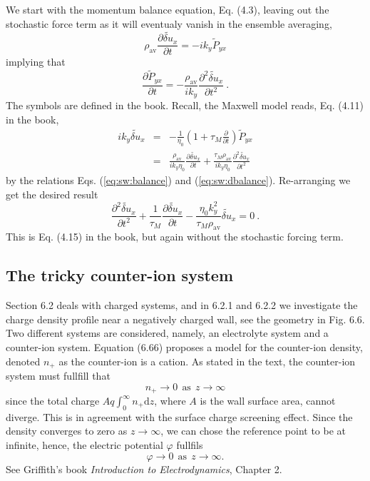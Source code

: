 \documentclass[11pt]{article}
\renewcommand{\d}{\mathrm{d}}
\begin{document}
We start with the momentum balance equation, Eq. (4.3), leaving out the stochastic force term as it will eventualy vanish in the ensemble 
averaging, 
\begin{equation}
	\label{eq:sw:balance}
	\rho_\text{av} \frac{\partial \widetilde{\delta u}_x}{\partial t} = -ik_y \widetilde{P}_{yx}
\end{equation}
implying that
\begin{equation}
	\label{eq:sw:dbalance}
	\frac{\partial \widetilde{P}_{yx}}{\partial t} = - \frac{\rho_\text{av}}{i k_y}\frac{\partial^2 \widetilde{\delta u}_x}{\partial t^2} \ .
\end{equation}
The symbols are defined in the book. Recall, the Maxwell model reads, Eq. (4.11) in the book,
\begin{eqnarray}
	ik_y \widetilde{\delta u}_x &=& - \frac{1}{\eta_0} \left(1 + \tau_M \frac{\partial}{\partial t}\right) \widetilde{P}_{yx} \\
	&=& \frac{\rho_\text{av}}{i k_y\eta_0} \frac{\partial \widetilde{\delta u}_x}{\partial t} 
	+ \frac{\tau_M \rho_\text{av}}{ik_y\eta_0}\frac{\partial^2\widetilde{\delta u}_x}{\partial t^2} 
\end{eqnarray}
by the relations Eqs. (\ref{eq:sw:balance}) and (\ref{eq:sw:dbalance}). Re-arranging we get the desired 
result
\begin{equation}
	\frac{\partial^2\widetilde{\delta u}_x}{\partial t^2} + \frac{1}{\tau_M} \frac{\partial \widetilde{\delta u}_x}{\partial t} - 
	\frac{\eta_0 k_y^2}{\tau_M \rho_\text{av}} \widetilde{\delta u}_x = 0 \ .
\end{equation}
This is Eq. (4.15) in the book, but again without the stochastic forcing term.

\subsection*{The tricky counter-ion system}
Section 6.2 deals with charged systems, and in 6.2.1 and 6.2.2 we investigate the 
charge density profile near a negatively charged wall, see the geometry in Fig. 6.6. 
Two different systems are considered, namely, an electrolyte system and a counter-ion system. 
Equation (6.66) proposes a model for the counter-ion density, denoted $n_+$ as the counter-ion is 
a cation. As stated in the text, the counter-ion system must fullfill that
\begin{equation}
\label{eq:tc:n+zero}	
	n_+ \rightarrow 0 \ \ \text{as} \ \ z \rightarrow \infty
\end{equation}
since the total charge $A q\int_0^\infty n_+ \d z$, where $A$ is the wall surface area, cannot 
diverge. This is in agreement with the surface charge screening effect. Since
the density converges to zero as $z \rightarrow \infty$, we can chose the
reference point to be at infinite, hence, the electric potential $\varphi$ fullfils  
\begin{equation}
\label{eq:tc:potential}
 \varphi \rightarrow 0 \ \ \text{as} \ \ z \rightarrow \infty.
\end{equation}
See Griffith's book \emph{Introduction to Electrodynamics}, Chapter 2.   
\end{document}
